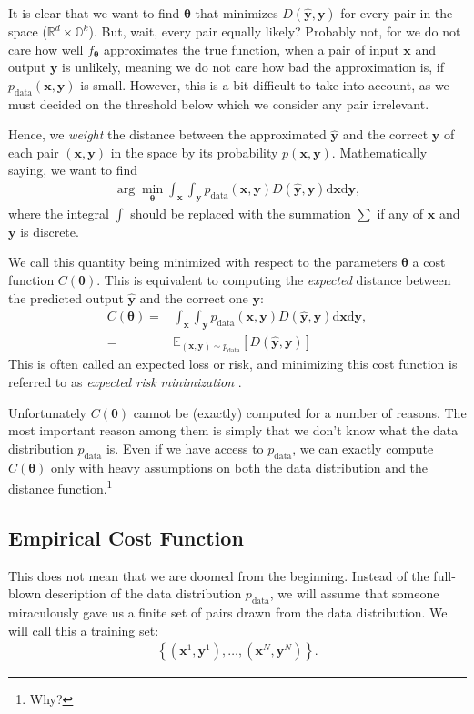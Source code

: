 \documentclass{report}
\newcommand{\vect}[1]{\mathbf{#1}}
\newcommand{\vects}[1]{\boldsymbol{#1}}
\newcommand{\vx}[0]{\vect{x}}
\newcommand{\vy}[0]{\vect{y}}
\newcommand{\TT}[0]{\vects{\theta}}
\newcommand{\RR}[0]{\mathbb{R}}
\newcommand{\OO}[0]{\mathbb{O}}
\newcommand{\E}[0]{\mathbb{E}}
\newcommand{\dd}[1]{\ensuremath{\mbox{d}#1}}
\begin{document}
It is clear that we want to find $\TT$ that minimizes $D(\hat{\vy}, \vy)$ for
every pair in the space ($\RR^d \times \OO^k$). But, wait, every pair equally
likely? Probably not, for we do not care how well $f_{\TT}$ approximates the
true function, when a pair of input $\vx$ and output $\vy$ is unlikely, meaning
we do not care how bad the approximation is, if $p_\text{data}(\vx, \vy)$ is
small. However, this is a bit difficult to take into account, as we must decided
on the threshold below which we consider any pair irrelevant.

Hence, we {\em weight} the distance between the approximated $\hat{\vy}$ and the
correct $\vy$ of each pair $(\vx, \vy)$ in the space by its probability $p(\vx,
\vy)$. Mathematically saying, we want to find 
\begin{align*}
    \arg\min_{\TT} \int_{\vx} \int_{\vy} p_{\text{data}}(\vx, \vy) D(\hat{\vy}, \vy) \dd{\vx}
    \dd{\vy},
\end{align*}
where the integral $\int$ should be replaced with the summation $\sum$ if any of
$\vx$ and $\vy$ is discrete.

We call this quantity being minimized with respect to the parameters $\TT$ a
cost function $C(\TT)$. This is equivalent to computing the {\em expected}
distance between the predicted output $\hat{\vy}$ and the correct one $\vy$:
\begin{align}
    \label{eq:expected_cost}
    C(\TT) =& \int_{\vx} \int_{\vy} p_{\text{data}}(\vx, \vy) D(\hat{\vy}, \vy) \dd{\vx}
    \dd{\vy}, \\
    =& \E_{(\vx,\vy) \sim p_{\text{data}}}\left[ D(\hat{\vy}, \vy) \right] 
\end{align}
This is often called an expected loss or risk, and minimizing this cost function
is referred to as {\em expected risk minimization} \citep{Vapnik1995}.

Unfortunately $C(\TT)$ cannot be (exactly) computed for a number of reasons. The
most important reason among them is simply that we don't know what the data
distribution $p_{\text{data}}$ is. Even if we have access to $p_{\text{data}}$,
we can exactly compute $C(\TT)$ only with heavy assumptions on both the data
distribution and the distance function.\footnote{Why?} 

\subsection{Empirical Cost Function}

This does not mean that we are doomed from the beginning. Instead of the
full-blown description of the data distribution $p_{\text{data}}$, we will
assume that someone miraculously gave us a finite set of pairs drawn from the
data distribution. We will call this a training set:
\begin{align*}
    \left\{ (\vx^1, \vy^1), \ldots, (\vx^N, \vy^N) \right\}.  
\end{align*}
\end{document}
